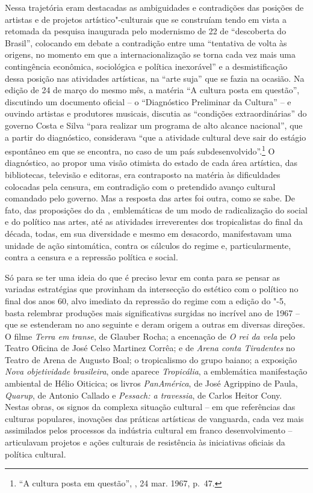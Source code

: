 Nessa trajetória eram destacadas as ambiguidades e contradições das
posições de artistas e de projetos artístico"-culturais que se
construíam tendo em vista a retomada da pesquisa inaugurada pelo
modernismo de 22 de ``descoberta do Brasil'', colocando em debate a
contradição entre uma ``tentativa de volta às origens, no momento em que
a internacionalização se torna cada vez mais uma contingência econômica,
sociológica e política inexorável'' e a desmistificação dessa posição
nas atividades artísticas, na ``arte suja'' que se fazia na ocasião. Na
edição de 24 de março do mesmo mês, a matéria ``A cultura posta em
questão'', discutindo um documento oficial -- o ``Diagnóstico
Preliminar da Cultura'' -- e ouvindo artistas e produtores musicais,
discutia as ``condições extraordinárias'' do governo Costa e Silva
``para realizar um programa de alto alcance nacional'', que a partir do
diagnóstico, considerava ``que a atividade cultural deve sair do estágio
espontâneo em que se encontra, no caso de um país
subdesenvolvido''.\footnote{``A cultura posta em questão'',
  {}, 24 mar. 1967, p.~47.} O diagnóstico, ao propor uma visão
otimista do estado de cada área artística, das bibliotecas, televisão e
editoras, era contraposto na matéria às dificuldades colocadas pela
censura, em contradição com o pretendido avanço cultural comandado pelo
governo. Mas a resposta das artes foi outra, como se sabe. De fato, das
proposições do  da , emblemáticas de um modo de radicalização
do social e do político nas artes, até as atividades irreverentes dos
tropicalistas do final da década, todas, em sua diversidade e mesmo em
desacordo, manifestavam uma unidade de ação sintomática, contra os
cálculos do regime e, particularmente, contra a censura e a repressão política e social.

Só para se ter uma ideia do que é preciso levar em conta para se pensar
as variadas estratégias que provinham da intersecção do estético com o
político no final dos anos 60, alvo imediato da repressão do regime com
a edição do "-5, basta relembrar produções mais significativas surgidas
no incrível ano de 1967 -- que se estenderam no ano seguinte e deram
origem a outras em diversas direções. O filme \emph{Terra em}
\emph{transe}, de Glauber Rocha; a encenação de \emph{O rei da vela}
pelo Teatro Oficina de José Celso Martinez Corrêa; e de \emph{Arena
conta Tiradentes} no Teatro de Arena de Augusto Boal; o tropicalismo do
grupo baiano; a exposição \emph{Nova objetividade brasileira}, onde
aparece \emph{Tropicália}, a emblemática manifestação ambiental de Hélio
Oiticica; os livros \emph{PanAmérica}, de José Agrippino de Paula,
\emph{Quarup}, de Antonio Callado e \emph{Pessach: a travessia}, de
Carlos Heitor Cony. Nestas obras, os signos da complexa situação
cultural -- em que referências das culturas populares, inovações das
práticas artísticas de vanguarda, cada vez mais assimilados pelos
processos da indústria cultural em franco desenvolvimento -- articulavam
projetos e ações culturais de resistência às iniciativas oficiais da
política cultural.


